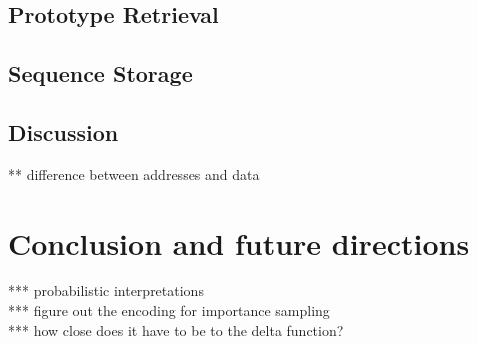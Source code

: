 \documentclass[10pt,letterpaper]{article}
\begin{document}
\subsection{Prototype Retrieval}




\subsection{Sequence Storage}



\subsection{Discussion}



** difference between addresses and data \\



\section{Conclusion and future directions}

*** probabilistic interpretations \\
*** figure out the encoding for importance sampling \\
*** how close does it have to be to the delta function? \\
\end{document}
